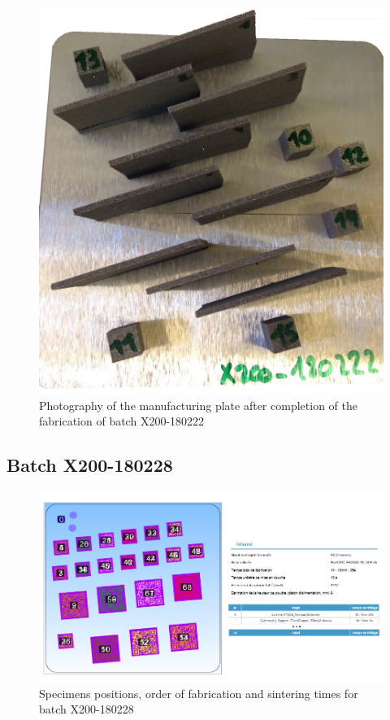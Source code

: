 \begin{figure}[h!]
\centering
\includegraphics[scale=0.22]{Images/180222-real}
\decoRule
\caption[Photography of the manufacturing plate after completion of the fabrication of batch X200-180109]{Photography of the manufacturing plate after completion of the fabrication of batch X200-180222}
\label{fig:180222-real}
\end{figure}

\newpage
\subsection{Batch X200-180228}

\begin{figure}[ht]
\centering
\includegraphics[scale=0.58]{Images/180228-cad}
\decoRule
\caption[Specimens positions, order of fabrication and sintering times for batch X200-180228]{Specimens positions, order of fabrication and sintering times for batch X200-180228}
\label{fig:180228-cad}
\end{figure}

